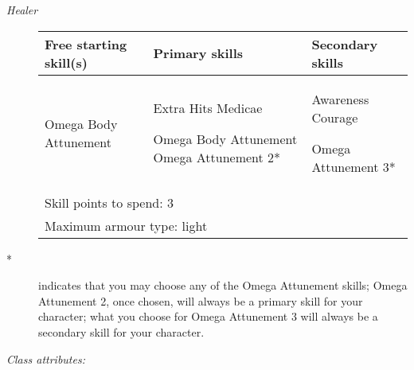 \documentclass{scrbook}
\begin{document}
\textit{Healer}

\begin{description}
\item[]
\begin{table}
\begin{tabular}{|l|l|l|} \hline 
Free starting skill(s) & Primary skills & Secondary skills \\
 \hline Omega Body Attunement & Extra Hits Medicae\par Omega Body Attunement Omega Attunement 2* & Awareness Courage\par Omega Attunement 3* \\
 \hline \multicolumn{3}{|l|}{Skill points to spend: 3} \\
 \hline \multicolumn{3}{|l|}{Maximum armour type: light} \\
 \hline \end{tabular}

\end{table}

\item[	*]indicates that you may choose any of the Omega Attunement skills; Omega Attunement 2, once chosen, will always be a primary skill for your character; what you choose for Omega Attunement 3 will always be a secondary skill for your character.

\end{description}

\textit{Class attributes:}
\end{document}
